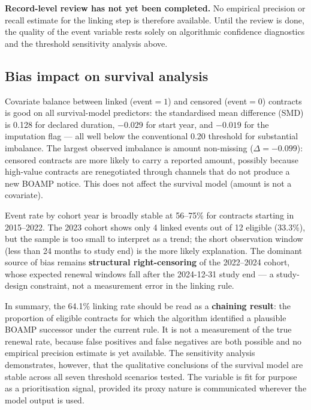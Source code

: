 \documentclass[11pt,a4paper]{article}
\begin{document}
\textbf{Record-level review has not yet been completed.} No empirical precision
or recall estimate for the linking step is therefore available. Until the review
is done, the quality of the event variable rests solely on algorithmic
confidence diagnostics and the threshold sensitivity analysis above.

\subsection*{Bias impact on survival analysis}

Covariate balance between linked (event$=1$) and censored (event$=0$) contracts
is good on all survival-model predictors: the standardised mean difference
(SMD) is 0.128 for declared duration, $-0.029$ for start year, and $-0.019$
for the imputation flag --- all well below the conventional 0.20 threshold
for substantial imbalance. The largest observed imbalance is amount
non-missing ($\Delta = -0.099$): censored contracts are more likely to carry a
reported amount, possibly because high-value contracts are renegotiated through
channels that do not produce a new BOAMP notice. This does not affect the
survival model (amount is not a covariate).

Event rate by cohort year is broadly stable at 56--75\% for contracts starting
in 2015--2022. The 2023 cohort shows only 4 linked events out of 12 eligible
(33.3\%), but the sample is too small to interpret as a trend; the short
observation window (less than 24 months to study end) is the more likely
explanation. The dominant source of bias remains \textbf{structural
right-censoring} of the 2022--2024 cohort, whose expected renewal windows fall
after the 2024-12-31 study end --- a study-design constraint, not a
measurement error in the linking rule.

\medskip
\noindent In summary, the 64.1\% linking rate should be read as a
\textbf{chaining result}: the proportion of eligible contracts for which the
algorithm identified a plausible BOAMP successor under the current rule. It is
not a measurement of the true renewal rate, because false positives and false
negatives are both possible and no empirical precision estimate is yet
available. The sensitivity analysis demonstrates, however, that the qualitative
conclusions of the survival model are stable across all seven threshold
scenarios tested. The variable is fit for purpose as a prioritisation signal,
provided its proxy nature is communicated wherever the model output is used.
\end{document}
